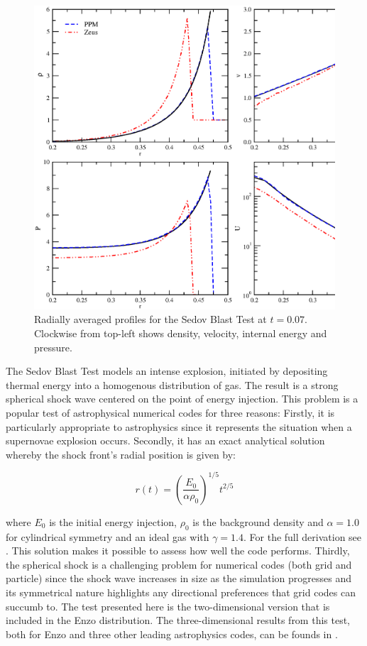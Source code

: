 \begin{figure}
\begin{center}
\includegraphics[width=\textwidth]{figures/sedov-profiles.eps}
\caption{Radially averaged profiles for the Sedov Blast Test at $t = 0.07$. Clockwise from top-left shows density, velocity, internal energy and pressure.}
\label{fig.sedov2}
\end{center}
\end{figure}

The Sedov Blast Test \citep{Sedov1959} models an intense explosion, initiated by depositing thermal energy into a homogenous distribution of gas. The result is a strong spherical shock wave centered on the point of energy injection.  This problem is a popular test of astrophysical numerical codes for three reasons: Firstly, it is particularly appropriate to astrophysics since it represents the situation when a supernovae explosion occurs. Secondly, it has an exact analytical solution whereby the shock front's radial position is given by:

\begin{equation}
r(t) = \left(\frac{E_0}{\alpha\rho_0}\right)^{1/5}t^{2/5}
\end{equation}

\noindent where $E_0$ is the initial energy injection, $\rho_0$ is the background density and $\alpha = 1.0$ for cylindrical symmetry and an ideal gas with $\gamma = 1.4$. For the full derivation see \citet{Sedov1959}. This solution makes it possible to assess how well the code performs. Thirdly, the spherical shock is a challenging problem for numerical codes (both grid and particle) since the shock wave increases in size as the simulation progresses and its symmetrical nature highlights any directional preferences that grid codes can succumb to. The test presented here is the two-dimensional version that is included in the Enzo distribution. The three-dimensional results from this test, both for Enzo and three other leading astrophysics codes, can be founds in \citet{Tasker2008}.

